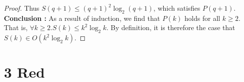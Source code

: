 \documentclass[10pt]{article}
\begin{document}
\begin{enumerate}[label={}]
\begin{proof}
                  Thus $S(q+1) \leq (q+1)^2 \log _2(q+1)$, which satisfies $P(q+1)$.\\

                  \textbf{Conclusion :} As a result of induction, we find that $P(k)$ holds for all $k \geq 2$. That is, $\forall k \geq 2 . S(k) \leq k^2 \log _2 k$. By definition, it is therefore the case that $S(k) \in O\left(k^2 \log _2 k\right)$.
            \end{proof}

\end{enumerate}

\newpage

\section*{3 \quad Red}
\end{document}

